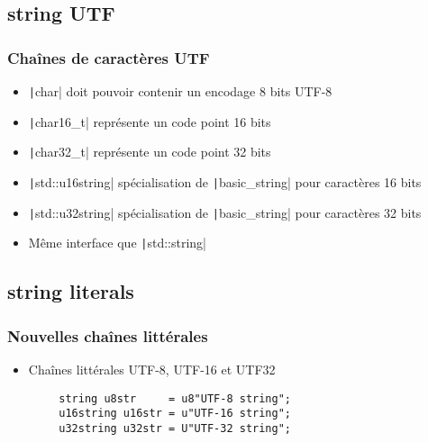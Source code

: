 \documentclass[C++.tex]{subfiles}
\begin{document}
\subsection*{string UTF}
\begin{frame}[fragile]
	\frametitle{Chaînes de caractères UTF}
	\begin{itemize}
		\item \texttt|char| doit pouvoir contenir un encodage 8 bits UTF-8


		\item \texttt|char16_t| représente un code point 16 bits
		\item \texttt|char32_t| représente un code point 32 bits
		\item \texttt|std::u16string| spécialisation de \texttt|basic_string| pour caractères 16 bits
		\item \texttt|std::u32string| spécialisation de \texttt|basic_string| pour caractères 32 bits
		\item Même interface que \texttt|std::string|
	\end{itemize}

\end{frame}

\subsection*{string literals}
\begin{frame}[fragile]
	\frametitle{Nouvelles chaînes littérales}
	\begin{itemize}
		\item Chaînes littérales UTF-8, UTF-16 et UTF32
	\end{itemize}

	\begin{verbatim}
		string u8str     = u8"UTF-8 string";
		u16string u16str = u"UTF-16 string";
		u32string u32str = U"UTF-32 string";
	\end{verbatim}

\end{frame}
\end{document}
